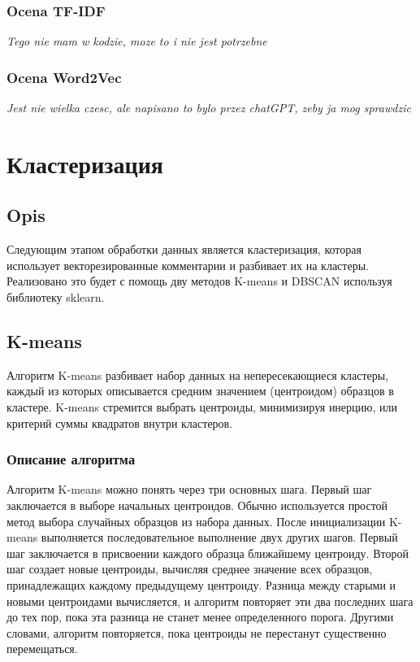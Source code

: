 		\subsubsection{Ocena  TF-IDF}
			\textit{Tego nie mam w kodzie, moze to i nie jest potrzebne}
		
		\subsubsection{Ocena  Word2Vec}
			\textit{Jest nie wielka czesc, ale napisano to bylo przez chatGPT, zeby ja mog sprawdzic}
		
	
\section{Кластеризация}

	\subsection{Opis}
		Следующим этапом обработки данных является кластеризация, которая использует векторезированные комментарии и разбивает их на кластеры. Реализовано это будет с помощь дву методов K-means и DBSCAN используя библиотеку sklearn.
	
	\subsection{K-means}
 		Алгоритм K-means  разбивает набор данных на непересекающиеся кластеры, каждый из которых описывается средним значением (центроидом) образцов в кластере. K-means стремится выбрать центроиды, минимизируя инерцию, или критерий суммы квадратов внутри кластеров.
	
		\subsubsection{Описание алгоритма}
			Алгоритм K-means можно понять через три основных шага. Первый шаг заключается в выборе начальных центроидов. Обычно используется простой метод выбора случайных образцов из набора данных. После инициализации K-means выполняется последовательное выполнение двух других шагов. Первый шаг заключается в присвоении каждого образца ближайшему центроиду. Второй шаг создает новые центроиды, вычисляя среднее значение всех образцов, принадлежащих каждому предыдущему центроиду. Разница между старыми и новыми центроидами вычисляется, и алгоритм повторяет эти два последних шага до тех пор, пока эта разница не станет менее определенного порога. Другими словами, алгоритм повторяется, пока центроиды не перестанут существенно перемещаться.

